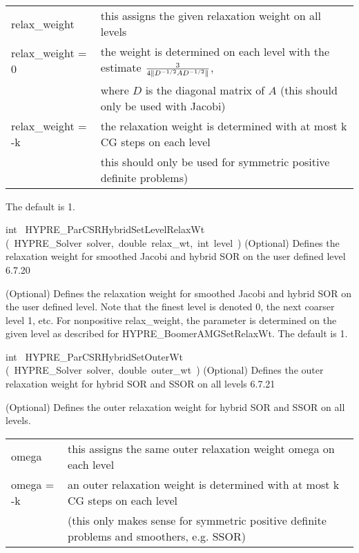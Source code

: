 \documentclass{article}
\begin{document}
\begin{cxxentry}
\begin{cxxentry}
\begin{cxxfunction}
\begin{cxxdoc}
\begin{tabular}{|l|l|} \hline
relax\_weight \> 0 & this assigns the given relaxation weight on all levels \\
relax\_weight = 0 &  the weight is determined on each level
with the estimate $3 \over {4\|D^{-1/2}AD^{-1/2}\|}$,\\
& where $D$ is the diagonal matrix of $A$ (this should only be used with Jacobi) \\
relax\_weight = -k & the relaxation weight is determined with at most k CG steps
on each level \\
& this should only be used for symmetric positive definite problems) \\
\hline
\end{tabular}

The default is 1.
\end{cxxdoc}
\end{cxxfunction}
\begin{cxxfunction}
{int\ }
        {HYPRE\_ParCSRHybridSetLevelRelaxWt}
        {(\ HYPRE\_Solver\ solver,\ double\ relax\_wt,\ int\ level\ )}
        {
(Optional) Defines the relaxation weight for smoothed Jacobi and hybrid SOR
on the user defined level}
        {6.7.20}
\begin{cxxdoc}

(Optional) Defines the relaxation weight for smoothed Jacobi and hybrid SOR
on the user defined level. Note that the finest level is denoted 0, the
next coarser level 1, etc. For nonpositive relax\_weight, the parameter is
determined on the given level as described for HYPRE\_BoomerAMGSetRelaxWt.
The default is 1.
\end{cxxdoc}
\end{cxxfunction}
\begin{cxxfunction}
{int\ }
        {HYPRE\_ParCSRHybridSetOuterWt}
        {(\ HYPRE\_Solver\ solver,\ double\ outer\_wt\ )}
        {
(Optional) Defines the outer relaxation weight for hybrid SOR and SSOR
on all levels}
        {6.7.21}
\begin{cxxdoc}

(Optional) Defines the outer relaxation weight for hybrid SOR and SSOR
on all levels.

\begin{tabular}{|l|l|} \hline
omega \> 0 & this assigns the same outer relaxation weight omega on each level\\
omega = -k & an outer relaxation weight is determined with at most k CG
steps on each level \\
& (this only makes sense for symmetric
positive definite problems and smoothers, e.g. SSOR) \\
\hline
\end{tabular}


\end{cxxdoc}
\end{cxxfunction}
\end{cxxentry}
\end{cxxentry}
\end{document}
